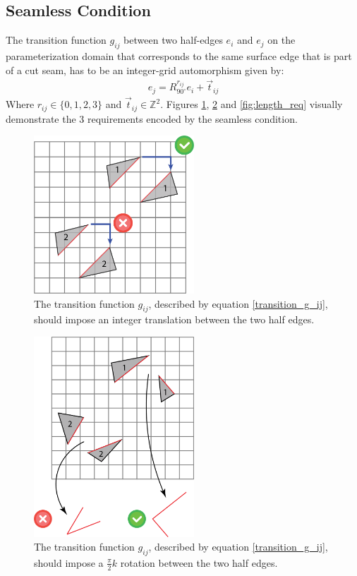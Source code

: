 \subsection{Seamless Condition}
\label{label:seamless_cond}
The transition function $g_{ij}$ between two half-edges $e_i$ and $e_j$ on the parameterization domain that corresponds to the same surface edge that is part of a cut seam, has to be an integer-grid automorphism given by:
\begin{equation}\label{transition_g_ij}
\begin{split}
e_j = R^{r_{ij}}_{90^\circ}e_i + \vec{t}_{ij}
\end{split}
\end{equation}
Where  $r_{ij} \in \{0,1,2,3\}$ and $\vec{t}_{ij} \in \mathbb{Z}^2$. Figures \ref{fig:translation_req}, \ref{fig:angle_req} and \ref{fig:length_req} visually demonstrate the 3 requirements encoded by the seamless condition.
\begin{figure}[ht]
\centering
\includegraphics[width=6cm]{figures/seamless/translation.png}
\caption[The Translation Requirement]{The transition function $g_{ij}$, described by equation \ref{transition_g_ij}, should impose an integer translation between the two half edges.}
\label{fig:translation_req}
\end{figure}
\begin{figure}[ht]
\centering
\includegraphics[width=6cm]{figures/seamless/angle.png}
\caption[The Angle Requirement]{The transition function $g_{ij}$, described by equation \ref{transition_g_ij}, should impose a $\frac{\pi}{2}k$ rotation between the two half edges.}
\label{fig:angle_req}
\end{figure}
